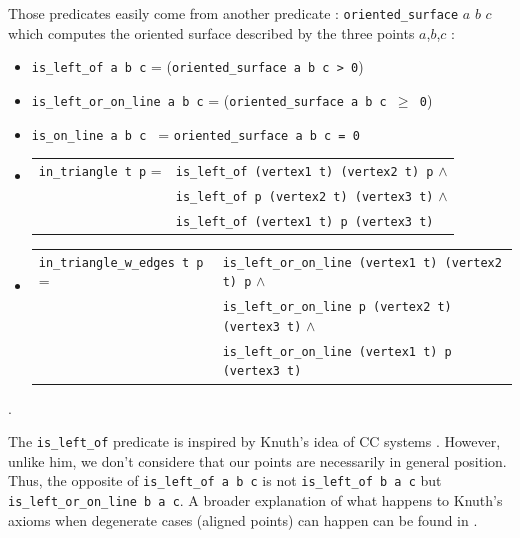 \documentclass[a4paper,10pt]{article}
\begin{document}
Those predicates easily come from another predicate : {\tt oriented\_surface} $a$ $b$ $c$  which computes the oriented surface described by the three points $a$,$b$,$c$ :
\begin{itemize}
\item {\tt is\_left\_of a b c} = ({\tt oriented\_surface a b c > 0})
  \item {\tt is\_left\_or\_on\_line a b c} = ({\tt oriented\_surface a b c $\geq$ 0})
  \item {\tt is\_on\_line a b c } = {\tt oriented\_surface a b c = 0}
\item \begin{tabular}{ll}
       {\tt in\_triangle t p} = & {\tt is\_left\_of (vertex1 t) (vertex2 t) p} $\wedge$\\
        & {\tt is\_left\_of p  (vertex2 t) (vertex3 t)} $\wedge$\\
  & {\tt is\_left\_of (vertex1 t) p (vertex3 t)}
      \end{tabular}
\item \begin{tabular}{ll}
       {\tt in\_triangle\_w\_edges t p} = & {\tt is\_left\_or\_on\_line (vertex1 t) (vertex2 t) p} $\wedge$\\
        & {\tt is\_left\_or\_on\_line p  (vertex2 t) (vertex3 t)} $\wedge$\\
  & {\tt is\_left\_or\_on\_line (vertex1 t) p (vertex3 t)}
        \end{tabular}
  \end{itemize}.

  The {\tt is\_left\_of} predicate is inspired by Knuth's idea of CC systems \cite{Knuth92}.
  However, unlike him, we don't considere that our points are necessarily in general position. Thus, the opposite of {\tt is\_left\_of a b c} is not {\tt is\_left\_of b a c} but {\tt is\_left\_or\_on\_line b a c}. A broader explanation of what happens to Knuth's axioms when degenerate cases (aligned points) can happen can be found in \cite{Hull}.
\end{document}
